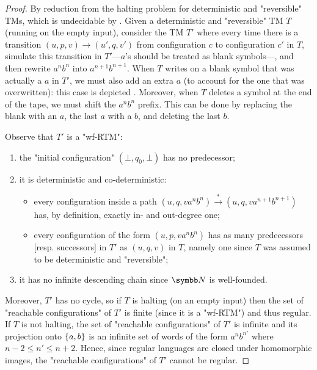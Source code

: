 \begin{proof}
    By reduction from the halting problem for deterministic and "reversible" TMs, which is undecidable by . Given a deterministic and "reversible" TM $T$ (running on the empty input), consider the TM $T'$ where every time there is a transition $(u, p, v) \to (u', q, v')$ from configuration $c$ to configuration $c'$ in $T$,
	simulate this transition in $T'$---$a$'s should be treated as blank symbols---,
	and then rewrite $a^n b^n$ into $a^{n+1}b^{n+1}$.
	When $T$ writes on a blank symbol that was actually a $a$ in $T'$,
	we must also add an extra $a$ (to account for the one that was overwritten):
	this case is depicted .
	Moreover, when $T$ deletes a symbol at the end of the tape,
	we must shift the $a^n b^n$ prefix. This can be done by replacing the blank
	with an $a$, the last $a$ with a $b$, and deleting the last $b$.
	
    Observe that $T'$ is a "wf-RTM":
    \begin{enumerate}
        \item the "initial configuration" $(\bot,q_0,\bot)$ has no predecessor;
        \item it is deterministic and co-deterministic:
        \begin{itemize}
            \item every configuration inside a path $(u, q, v a^n b^n) \xrightarrow{*} (u, q, v a^{n+1} b^{n+1})$ 
            has, by definition, exactly in- and out-degree one;
            \item every configuration of the form $(u, p, v a^n b^n)$ has as many predecessors 
            [resp. successors] in $T'$ as $(u,q,v)$ in $T$, namely one since $T$ was assumed to be
                deterministic and "reversible";
        \end{itemize}
        \item it has no infinite descending chain since $\N$ is well-founded.
    \end{enumerate}
    Moreover, $T'$ has no cycle,
    so if $T$ is halting (on an empty input) then the set of "reachable configurations" of $T'$ is finite (since it is a "wf-RTM") and thus regular. If $T$ is not halting, the set of "reachable configurations" of $T'$ is infinite and its projection onto $\{a,b\}$ is an infinite set of words of the form $a^{n} b^{n'}$ where $n-2 \leq n' \leq n+2$. Hence, since regular languages are closed under homomorphic images, the "reachable configurations" of $T'$ cannot be regular.
\end{proof}


